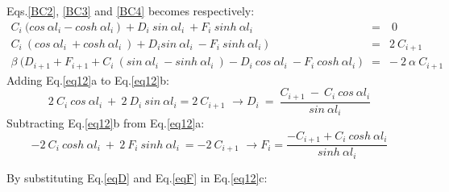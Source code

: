 \documentclass{article}
\begin{document}
{\noindent Eqs.\ref{BC2}, \ref{BC3} and \ref{BC4} becomes respectively:
\begin{subequations}
    \begin{align}
 C_i \ \big( cos\ \alpha l_i - cosh\ \alpha l_i\  \big) \ + D_i \ sin\ \alpha l_i\  + F_i \ sinh\ \alpha l_i\  \ & = &\ 0\\
C_i \ ( cos\ \alpha l_i\ + cosh\ \alpha l_i\ )   + D_i sin\ \alpha l_i\  - F_i \ sinh\ \alpha l_i\ ) & = & 2 \ C_{i+1}\\
\beta \ \big ( D_{i+1} + F_{i+1} +  C_i \ (sin\ \alpha l_i\  - sinh\ \alpha l_i\  ) - D_i\  cos\ \alpha l_i\  - F_i \ cosh\ \alpha l_i\  \big) & = & - \ 2 \  \alpha \ C_{i+1}
    \end{align}
    \label{eq12}
\end{subequations}
\noindent Adding Eq.\ref{eq12}a to Eq.\ref{eq12}b: 
\begin{equation}
    2 \ C_i \ cos \ \alpha l_i \ + \ 2 \ D_i \ sin \ \alpha l_i  = 2 \ C_{i+1} \, \, \xrightarrow{} D_i \ = \ \dfrac{C_{i+1} \ - \ C_i \ cos\ \alpha l_i}{sin\ \alpha l_i}
    \label{eqD}
\end{equation}
\noindent Subtracting Eq.\ref{eq12}b from Eq.\ref{eq12}a:
\begin{equation}
    - 2 \ C_i \ cosh \ \alpha l_i \  + \ 2 \ F_i \ sinh \ \alpha l_i\  = -2 \ C_{i+1} \, \, \xrightarrow{} F_i = \dfrac{-C_{i+1} + C_i \ cosh \ \alpha l_i}{sinh\ \alpha l_i}
    \label{eqF}
\end{equation}


\noindent By substituting Eq.\ref{eqD} and Eq.\ref{eqF} in Eq.\ref{eq12}c:

}
\end{document}
